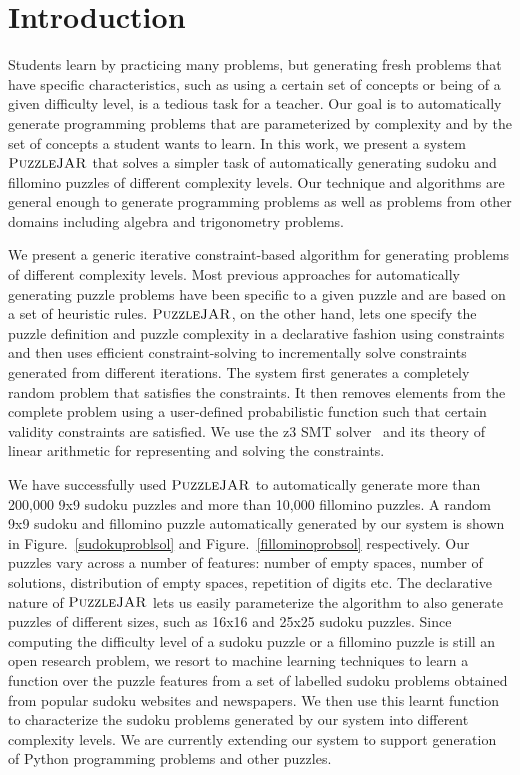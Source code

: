 \section{Introduction}

Students learn by practicing many problems, but generating fresh
problems that have specific characteristics, such as using a certain
set of concepts or being of a given difficulty level, is a tedious
task for a teacher. Our goal is to automatically generate programming
problems that are parameterized by complexity and by the set of
concepts a student wants to learn. In this work, we present a system
$\textsc{PuzzleJAR}$ that solves a simpler task of automatically generating
sudoku and fillomino puzzles of different complexity levels. Our
technique and algorithms are general enough to generate programming
problems as well as problems from other domains including algebra and
trigonometry problems.

We present a generic iterative constraint-based algorithm for
generating problems of different complexity levels. Most previous
approaches for automatically generating puzzle problems have been
specific to a given puzzle and are based on a set of heuristic
rules. $\textsc{PuzzleJAR}$, on the other hand, lets one specify the puzzle
definition and puzzle complexity in a declarative fashion using
constraints and then uses efficient constraint-solving to
incrementally solve constraints generated from different
iterations. The system first generates a completely random problem
that satisfies the constraints. It then removes elements from the
complete problem using a user-defined probabilistic function such that
certain validity constraints are satisfied. We use the z3 SMT
solver~\cite{z3} and its theory of linear arithmetic for representing
and solving the constraints.

We have successfully used $\textsc{PuzzleJAR}$ to automatically generate more
than 200,000 9x9 sudoku puzzles and more than 10,000 fillomino
puzzles. A random 9x9 sudoku and fillomino puzzle automatically
generated by our system is shown in Figure.~\ref{sudokuproblsol} and
Figure.~\ref{fillominoprobsol} respectively. Our puzzles vary across a
number of features: number of empty spaces, number of solutions,
distribution of empty spaces, repetition of digits etc. The
declarative nature of $\textsc{PuzzleJAR}$ lets us easily parameterize the
algorithm to also generate puzzles of different sizes, such as 16x16
and 25x25 sudoku puzzles. Since computing the difficulty level of a
sudoku puzzle or a fillomino puzzle is still an open research problem,
we resort to machine learning techniques to learn a function over the
puzzle features from a set of labelled sudoku problems obtained from
popular sudoku websites and newspapers. We then use this learnt
function to characterize the sudoku problems generated by our system
into different complexity levels. We are currently extending our
system to support generation of Python programming problems and other
puzzles.


